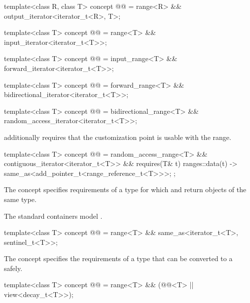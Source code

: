 \begin{itemdecl}
template<class R, class T>
  concept @@ =
    range<R> && output_iterator<iterator_t<R>, T>;

template<class T>
  concept @@ =
    range<T> && input_iterator<iterator_t<T>>;

template<class T>
  concept @@ =
    input_range<T> && forward_iterator<iterator_t<T>>;

template<class T>
  concept @@ =
    forward_range<T> && bidirectional_iterator<iterator_t<T>>;

template<class T>
  concept @@ =
    bidirectional_range<T> && random_access_iterator<iterator_t<T>>;
\end{itemdecl}

\pnum
{} additionally requires that
the  customization point
is usable with the range.

\begin{itemdecl}
template<class T>
  concept @@ =
    random_access_range<T> && contiguous_iterator<iterator_t<T>> &&
    requires(T& t) {
      { ranges::data(t) } -> same_as<add_pointer_t<range_reference_t<T>>>;
    };
\end{itemdecl}

\pnum
The  concept specifies requirements of
a  type for which  and
 return objects of the same type.
\begin{example}
The standard containers model .
\end{example}

\begin{itemdecl}
template<class T>
  concept @@ =
    range<T> && same_as<iterator_t<T>, sentinel_t<T>>;
\end{itemdecl}

\pnum
The  concept specifies the requirements of a
 type that can be converted to a  safely.

\begin{itemdecl}
template<class T>
  concept @@ =
    range<T> && (@@<T> || view<decay_t<T>>);
\end{itemdecl}

